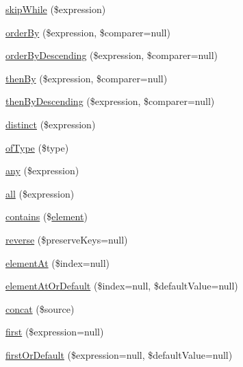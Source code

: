 \begin{DoxyCompactItemize}
\hyperlink{class_p_h_p_linq___linq_to_zend_db_a24ee105087c3674aeebbe5ded87dd389}{skip\-While} (\$expression)
\item 
\hyperlink{class_p_h_p_linq___linq_to_zend_db_a4da1bd83e986083bb8d34a401e8ebe2c}{order\-By} (\$expression, \$comparer=null)
\item 
\hyperlink{class_p_h_p_linq___linq_to_zend_db_a76ee5b40b6c67d792788c1dc1da2f1cf}{order\-By\-Descending} (\$expression, \$comparer=null)
\item 
\hyperlink{class_p_h_p_linq___linq_to_zend_db_a05857c194334417f951036f26570c348}{then\-By} (\$expression, \$comparer=null)
\item 
\hyperlink{class_p_h_p_linq___linq_to_zend_db_ad98ee4890a9297e3bb1689e340a51597}{then\-By\-Descending} (\$expression, \$comparer=null)
\item 
\hyperlink{class_p_h_p_linq___linq_to_zend_db_ad88bb13ea1b971fd2a973334caa4668f}{distinct} (\$expression)
\item 
\hyperlink{class_p_h_p_linq___linq_to_zend_db_a0a2ba7c0fc2611ebdb7af7827adac344}{of\-Type} (\$type)
\item 
\hyperlink{class_p_h_p_linq___linq_to_zend_db_a658a448c5998940e8d7f21a351403439}{any} (\$expression)
\item 
\hyperlink{class_p_h_p_linq___linq_to_zend_db_a74f8883392f4b48edb0fcd7aa05f3944}{all} (\$expression)
\item 
\hyperlink{class_p_h_p_linq___linq_to_zend_db_a13c5d8a1f5c3552eea74839799acebab}{contains} (\$\hyperlink{bug-904820_8php_aa94081298ab2dfd0f261cce6c203d9aa}{element})
\item 
\hyperlink{class_p_h_p_linq___linq_to_zend_db_a8c53c55a81fa2256fd89655f945059aa}{reverse} (\$preserve\-Keys=null)
\item 
\hyperlink{class_p_h_p_linq___linq_to_zend_db_aed8dd8dd04c924a6e7c9626f29f537df}{element\-At} (\$index=null)
\item 
\hyperlink{class_p_h_p_linq___linq_to_zend_db_ada7377d6eff2a6ad171c0616ec6271b8}{element\-At\-Or\-Default} (\$index=null, \$default\-Value=null)
\item 
\hyperlink{class_p_h_p_linq___linq_to_zend_db_a3e57723b96efe016e8a95ff23bfbc82e}{concat} (\$source)
\item 
\hyperlink{class_p_h_p_linq___linq_to_zend_db_a9c368dc77913f7cf4268bcaab18f848b}{first} (\$expression=null)
\item 
\hyperlink{class_p_h_p_linq___linq_to_zend_db_a970d3424f925820d6d9f0b4e2b1aa52c}{first\-Or\-Default} (\$expression=null, \$default\-Value=null)

\end{DoxyCompactItemize}
